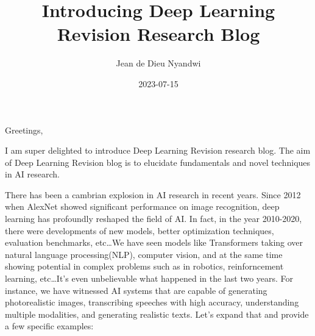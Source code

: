 \documentclass[
  letterpaper,
  DIV=11,
  numbers=noendperiod]{scrartcl}
\title{Introducing Deep Learning Revision Research Blog}
\author{Jean de Dieu Nyandwi}
\date{2023-07-15}
\begin{document}
\maketitle
\ifdefined\Shaded\renewenvironment{Shaded}{\begin{tcolorbox}[frame hidden, interior hidden, breakable, sharp corners, borderline west={3pt}{0pt}{shadecolor}, boxrule=0pt, enhanced]}{\end{tcolorbox}}\fi

Greetings,

I am super delighted to introduce Deep Learning Revision research blog.
The aim of Deep Learning Revision blog is to elucidate fundamentals and
novel techniques in AI research.

There has been a cambrian explosion in AI research in recent years.
Since 2012 when AlexNet showed significant performance on image
recognition, deep learning has profoundly reshaped the field of AI. In
fact, in the year 2010-2020, there were developments of new models,
better optimization techniques, evaluation benchmarks, etc\ldots We have
seen models like Transformers taking over natural language
processing(NLP), computer vision, and at the same time showing potential
in complex problems such as in robotics, reinforncement learning,
etc\ldots It's even unbelievable what happened in the last two years.
For instance, we have witnessed AI systems that are capable of
generating photorealistic images, transcribing speeches with high
accuracy, understanding multiple modalities, and generating realistic
texts. Let's expand that and provide a few specific examples:
\end{document}
